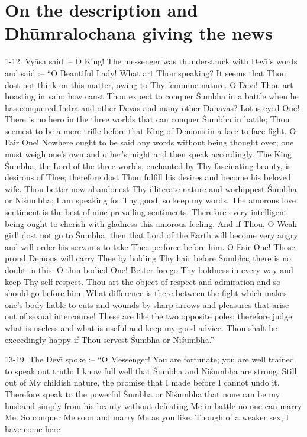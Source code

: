 \chapter{On the description and Dh\=umralochana giving the news}

1-12. Vy\=asa said :-- O King! The messenger was thunderstruck with Dev\={\i}'s words and said :-- ``O Beautiful Lady! What art Thou speaking? It seems that Thou dost not think on this matter, owing to Thy feminine nature. O Dev\={\i}! Thou art boasting in vain; how canst Thou expect to conquer \'Sumbha in a battle when he has conquered Indra and other Devas and many other D\=anavas? Lotus-eyed One! There is no hero in the three worlds that can conquer \'Sumbha in battle; Thou seemest to be a mere trifle before that King of Demons in a face-to-face fight. O Fair One! Nowhere ought to be said any words without being thought over; one must weigh one's own and other's might and then speak accordingly. The King \'Sumbha, the Lord of the three worlds, enchanted by Thy fascinating beauty, is desirous of Thee; therefore dost Thou fulfill his desires and become his beloved wife. Thou better now abandonest Thy illiterate nature and worhippest \'Sumbha or Ni\'sumbha; I am speaking for Thy good; so keep my words. The amorous love sentiment is the best of nine prevailing sentiments. Therefore every intelligent being ought to cherish with gladness this amorous feeling. And if Thou, O Weak girl! dost not go to \'Sumbha, then that Lord of the Earth will become very angry and will order his servants to take Thee perforce before him. O Fair One! Those proud Demons will carry Thee by holding Thy hair before \'Sumbha; there is no doubt in this. O thin bodied One! Better forego Thy boldness in every way and keep Thy self-respect. Thou art the object of respect and admiration and so should go before him. What difference is there between the fight which makes one's body liable to cuts and wounds by sharp arrows and pleasures that arise out of sexual intercourse! These are like the two opposite poles; therefore judge what is useless and what is useful and keep my good advice. Thou shalt be exceedingly happy if Thou servest \'Sumbha or Ni\'sumbha.''

13-19. The Dev\={\i} spoke :-- ``O Messenger! You are fortunate; you are well trained to speak out truth; I know full well that \'Sumbha and Ni\'sumbha are strong. Still out of My childish nature, the promise that I made before I cannot undo it. Therefore speak to the powerful \'Sumbha or Ni\'sumbha that none can be my husband simply from his beauty without defeating Me in battle no one can marry Me. So conquer Me soon and marry Me as you like. Though of a weaker sex, I have come here

